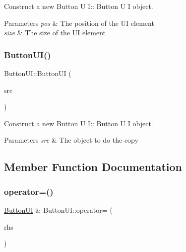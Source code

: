 Construct a new Button U I\+:\+: Button U I object. 


\begin{DoxyParams}{Parameters}
{\em pos} & The position of the UI element \\
\hline
{\em size} & The size of the UI element \\
\hline
\end{DoxyParams}
\mbox{\label{class_button_u_i_a64d56901e494b8ae4fdd550631135ce0}} 
\subsubsection{\texorpdfstring{Button\+U\+I()}{ButtonUI()}\hspace{0.1cm}{\footnotesize\ttfamily [2/2]}}
{\footnotesize\ttfamily Button\+U\+I\+::\+Button\+UI (\begin{DoxyParamCaption}\item[{\hyperlink{class_button_u_i}{Button\+UI} const \&}]{src }\end{DoxyParamCaption})}



Construct a new Button U I\+:\+: Button U I object. 


\begin{DoxyParams}{Parameters}
{\em src} & The object to do the copy \\
\hline
\end{DoxyParams}


\subsection{Member Function Documentation}
\mbox{\label{class_button_u_i_a17cfc6a63fb650c756d7f0afadad665e}} 
\subsubsection{\texorpdfstring{operator=()}{operator=()}}
{\footnotesize\ttfamily \hyperlink{class_button_u_i}{Button\+UI} \& Button\+U\+I\+::operator= (\begin{DoxyParamCaption}\item[{\hyperlink{class_button_u_i}{Button\+UI} const \&}]{rhs }\end{DoxyParamCaption})}



